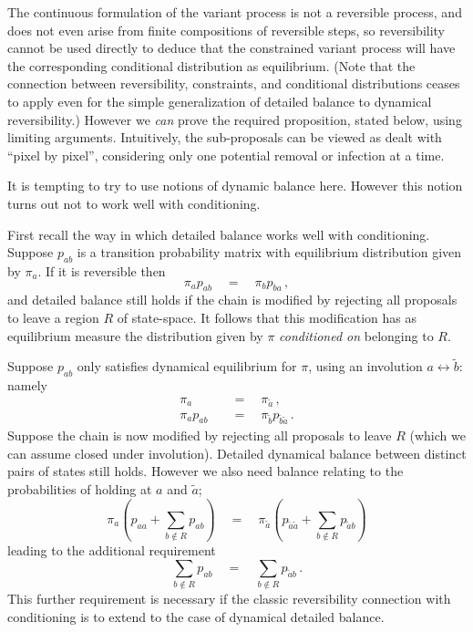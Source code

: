 \documentclass[]{article}
\begin{document}
The continuous formulation of the
variant process is not a reversible process,
and does not even arise from finite compositions 
of reversible steps, so 
reversibility cannot be used directly to deduce 
that the constrained
variant process will have the corresponding conditional distribution as equilibrium.
(Note that the connection between reversibility,
constraints, and conditional distributions
ceases to apply even for the simple generalization
of detailed balance to dynamical reversibility.)
However we \emph{can} prove the required proposition, stated below,
using limiting arguments.
Intuitively, the sub-proposals can be viewed as dealt with ``pixel by pixel'', 
considering only one potential
removal or infection at a time.

\begin{NoteThis2}
It is tempting to try to use notions of 
dynamic balance here. However this notion
turns out not to work well with conditioning.


First recall the way in which detailed balance
works well with conditioning.
Suppose \(p_{ab}\) is a transition probability
matrix with equilibrium distribution given
by \(\pi_a\). If it is reversible then
\[
\pi_a p_{ab} \quad=\quad \pi_b p_{ba}\,,
\]
and detailed balance still holds
if the chain is modified
by rejecting all proposals to leave a region \(R\)
of state-space. It follows that this modification
has as equilibrium measure the 
distribution given by \(\pi\) 
\emph{conditioned on} belonging to \(R\).

Suppose \(p_{ab}\) only satisfies dynamical
equilibrium for \(\pi\), using an
involution \(a\leftrightarrow\widetilde{b}\):
namely
\begin{align*}
\pi_a \quad&=\quad \pi_{\widetilde{a}}\,,
\\
\pi_a p_{ab} \quad&=\quad 
\pi_{\widetilde{b}} p_{\widetilde{
b}\widetilde{a}} 
\,.
\end{align*}
Suppose the chain is now modified by rejecting 
all proposals to leave \(R\)
(which we can assume closed under involution).
Detailed dynamical
balance between distinct pairs of states
still holds. However we also need
balance relating to the probabilities
of holding at \(a\) and \(\widetilde{a}\);
\[
\pi_a \left(p_{aa} + \sum_{b\not\in R}p_{ab}\right)
\quad=\quad
\pi_{\widetilde{a}} \left(p_{\widetilde{a}\widetilde{a}} + \sum_{b\not\in R}p_{\widetilde{a}b}\right)
\]
leading to the additional requirement
\[
\sum_{b\not\in R}p_{ab}
\quad=\quad
\sum_{b\not\in R}p_{\widetilde{a}b}
\,.
\]
This further requirement is necessary if the classic reversibility connection with conditioning
is to extend to the case of dynamical detailed balance.


\end{NoteThis2}
\end{document}
